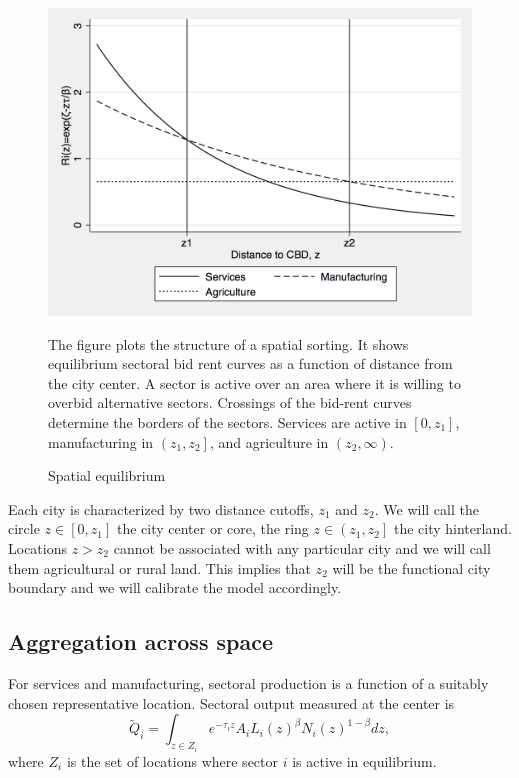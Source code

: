 \documentclass[12pt]{article}
\begin{document}
\begin{figure}[h!]
\caption{Spatial equilibrium\label{fig:BidRent}}
\begin{center}
\includegraphics[scale=0.4]{figures/bid_rent_curves}
\end{center}

\noindent \footnotesize{The figure plots the structure of a spatial sorting. It shows equilibrium sectoral bid rent curves as a function of distance from the city center. A sector is active over an area where it is willing to overbid alternative sectors. Crossings of the bid-rent curves determine the borders of the sectors. Services are active in $[0,z_1]$, manufacturing in $\left(z_1,z_2\right]$, and agriculture in $(z_2,\infty)$.}
\end{figure}

Each city is characterized by two distance cutoffs, $z_1$ and $z_2$. We will call the circle $z\in\left[0,z_1\right]$ the city center or core, the ring $z\in\left(z_1,z_2\right]$ the city hinterland. Locations $z>z_2$ cannot be associated with any particular city and we will call them agricultural or rural land. This implies that $z_2$ will be the functional city boundary and we will calibrate the model accordingly.

\subsection{Aggregation across space}
For services and manufacturing, sectoral production is a function of a suitably chosen representative location. Sectoral output measured at the center is
\begin{equation*}
\tilde{Q}_i=\int_{z\in Z_i}e^{-\tau_i z}A_iL_i(z)^\beta N_i(z)^{1-\beta}dz,
\end{equation*}
where $Z_i$ is the set of locations where sector $i$ is active in equilibrium.
\end{document}
